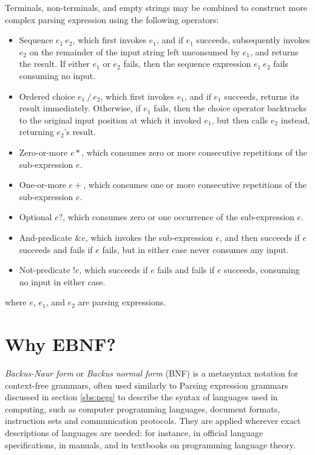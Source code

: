 \documentclass[english,engineering]{wizthesis}
\begin{document}
Terminals, non-terminals, and empty strings may be combined to construct more
complex parsing expression using the following operators:
\begin{itemize}[noitemsep]
  \item Sequence $e_1\ e_2$, which first invokes $e_1$, and if $e_1$ succeeds,
  subsequently invokes $e_2$ on the remainder of the input string left
  unconsumed by $e_1$, and returns the result. If either $e_1$ or $e_2$ fails,
  then the sequence expression $e_1\ e_2$ fails consuming no input.
  \item Ordered choice $e_1\ /\ e_2$, which first invokes $e_1$, and if $e_1$
  succeeds, returns its result immediately. Otherwise, if $e_1$ fails, then the
  choice operator backtracks to the original input position at which it invoked
  $e_1$, but then calls $e_2$ instead, returning $e_2$'s result.
  \item Zero-or-more $e*$, which consumes zero or more consecutive repetitions
  of the sub-expression $e$.
  \item One-or-more $e+$, which consumes one or more consecutive repetitions of
  the sub-expression $e$.
  \item Optional $e?$, which consumes zero or one occurrence of the
  sub-expression $e$.
  \item And-predicate $\&e$, which invokes the sub-expression $e$, and then
  succeeds if $e$ succeeds and fails if $e$ fails, but in either case never
  consumes any input.
  \item Not-predicate $!e$, which succeeds if $e$ fails and fails if $e$
  succeeds, consuming no input in either case.
\end{itemize}
where $e$, $e_1$, and $e_2$ are parsing expressions. 

\section{Why EBNF?} \label{sec:why-ebnf}

\emph{Backus-Naur form} or \emph{Backus normal form} (BNF) is a metasyntax
notation for context-free grammars, often used similarly to Parsing expression
grammars discussed in section \ref{sbs:pegs} to describe the syntax of languages
used in computing, such as computer programming languages, document formats,
instruction sets and communication protocols. They are applied wherever exact
descriptions of languages are needed: for instance, in official language
specifications, in manuals, and in textbooks on programming language theory.
\end{document}
